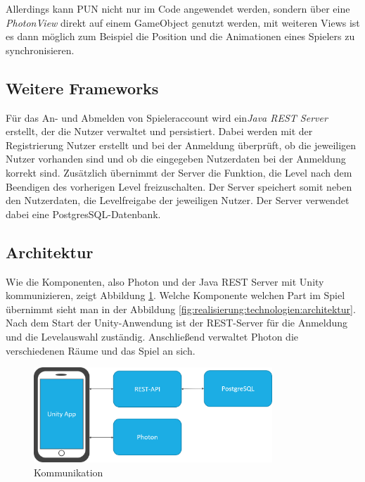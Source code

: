 Allerdings kann PUN nicht nur im Code angewendet werden, sondern über eine \textit{PhotonView} direkt auf einem GameObject genutzt werden, mit weiteren Views ist es dann möglich zum Beispiel die Position und die Animationen eines Spielers zu synchronisieren. 

\subsection{Weitere Frameworks}
\label{subsec:realisierung:technologien:frameworks}
Für das An- und Abmelden von Spieleraccount wird ein\textit{Java REST Server} erstellt, der die Nutzer verwaltet und persistiert. Dabei werden mit der Registrierung Nutzer erstellt und bei der Anmeldung überprüft, ob die jeweiligen Nutzer vorhanden sind und ob die eingegeben Nutzerdaten bei der Anmeldung korrekt sind. Zusätzlich übernimmt der Server die Funktion, die Level nach dem Beendigen des vorherigen Level freizuschalten. Der Server speichert somit neben den Nutzerdaten, die Levelfreigabe der jeweiligen Nutzer. Der Server verwendet dabei eine PostgresSQL-Datenbank.

\subsection{Architektur}
\label{subsec:realisierung:technologien:architektur}
Wie die Komponenten, also Photon und der Java REST Server mit Unity kommunizieren, zeigt Abbildung \ref{fig:realisierung:technologien:kommunikation}. Welche Komponente welchen Part im Spiel übernimmt sieht man in der Abbildung \ref{fig:realisierung:technologien:architektur}. Nach dem Start der Unity-Anwendung ist der REST-Server für die Anmeldung und die Levelauswahl zuständig. Anschließend verwaltet Photon die verschiedenen Räume und das Spiel an sich.

\begin{figure}[H]
    \begin{center}
      \includegraphics[width=0.8\textwidth]{img/realisierung/Kommunikation}
      \caption{Kommunikation}
      \label{fig:realisierung:technologien:kommunikation}
    \end{center}
\end{figure}

